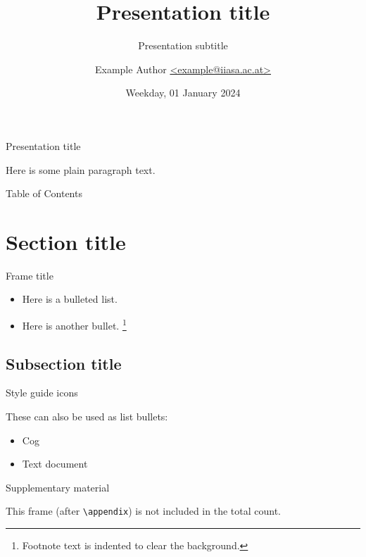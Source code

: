 \documentclass[aspectratio=169]{beamer}
\title{Presentation title}
\subtitle{Presentation subtitle}
\author{Example Author
  \href{mailto:example@iiasa.ac.at}%
  {\ttfamily <example@iiasa.ac.at>}}
\date{Weekday, 01 January 2024}
\institute{Venue for presentation}
\begin{document}
\maketitle

\begin{frame}{Presentation title}

  Here is some plain paragraph text.

\end{frame}

\begin{frame}{Table of Contents}

  \tableofcontents

\end{frame}

\section{Section title}

\begin{frame}{Frame title}

  \begin{itemize}
    \item Here is a bulleted list.
    \item Here is another bullet.
      \footnote{Footnote text is indented to clear the background.}
  \end{itemize}

\end{frame}

\subsection{Subsection title}

\begin{frame}{Style guide icons}


  These can also be used as list bullets:

  \begin{itemize}
    \item [\iiasaicon{cog}] Cog
    \item [\iiasaicon{doc-text}] Text document
  \end{itemize}

\end{frame}

\makefinalslide

\appendix

\begin{frame}{Supplementary material}

  This frame (after \texttt{\textbackslash{}appendix}) is not included in the total count.

\end{frame}
\end{document}
